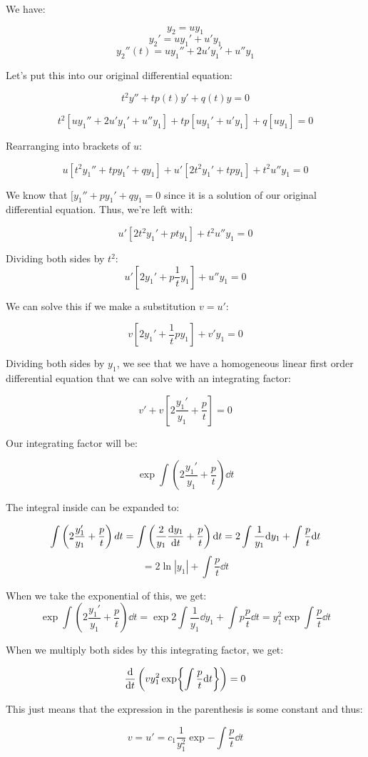 \documentclass{report}
\begin{document}
{We have:

$$y_2 = uy_1$$
$$y_2' = uy_1' + u'y_1$$
$$y_2''(t) = uy_1'' + 2u'y_1' + u''y_1$$

Let's put this into our original differential equation:

$$t^2y'' + tp(t)y' + q(t)y = 0$$

$$t^2[uy_1'' + 2u'y_1' + u''y_1] + tp[uy_1' + u'y_1] + q[uy_1] = 0$$

Rearranging into brackets of $u$:

$$u[t^2y_1''+tpy_1'+qy_1] + u'[2t^2y_1'+tpy_1] + t^2u''y_1 = 0$$

We know that $[y_1''+py_1'+qy_1 = 0$ since it is a solution of our original differential equation. Thus, we're left with:

$$u'[2t^2y_1'+pty_1] + t^2u''y_1 = 0$$

Dividing both sides by $t^2$:
$$u'[2y_1'+p\frac{1}{t}y_1] + u''y_1 = 0$$

We can solve this if we make a substitution $v = u'$:


$$v[2y_1'+\frac{1}{t}py_1] + v'y_1 = 0$$

Dividing both sides by $y_1$, we see that we have a homogeneous linear first order differential equation that we can solve with an integrating factor:

$$v' + v\left[ 2\frac{y_1'}{y_1} + \frac{p}{t}\right]  = 0$$

Our integrating factor will be:

$$\exp{ \int \left( 2\frac{y_1'}{y_1} + \frac{p}{t} \right) \dd t}$$

The integral inside can be expanded to:

$$\int \left( 2\frac{y_1'}{y_1} + \frac{p}{t} \right) dt 
= \int \left( \frac{2}{y_1}\dv{y_1}{t} + \frac{p}{t} \right) \dd t
= 2\int \frac{1}{y_1} \dd y_1 + \int \frac{p}{t} \dd t$$
$$= 2\ln|y_1| + \int \frac{p}{t} \dd t$$

When we take the exponential of this, we get:
$$\exp{ \int \left( 2\frac{y_1'}{y_1} + \frac{p}{t} \right) \dd t}
= \exp{2\int \frac{1}{y_1} \dd y_1 + \int p\frac{p}{t} \dd t} = y_1^2\exp{\int \frac{p}{t} \dd t}$$


When we multiply both sides by this integrating factor, we get:

$$\dv{}{t} \left( vy_1^2\exp{\int  \frac{p}{t} \dd t}\right) = 0$$


This just means that the expression in the parenthesis is some constant and thus:

$$v = u' = c_1\frac{1}{y_1^2}\exp{-\int \frac{p}{t} \dd t}$$

}
\end{document}
